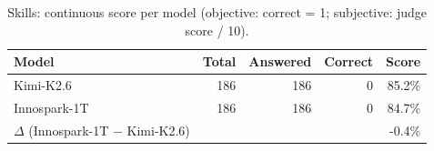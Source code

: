 \begin{table}[H]
  \centering
  \begin{tabular}{l r r r r}
    \toprule
    \textbf{Model} & \textbf{Total} & \textbf{Answered} & \textbf{Correct} & \textbf{Score} \\
    \midrule
    Kimi-K2.6 & 186 & 186 & 0 & 85.2\% \\
    Innospark-1T & 186 & 186 & 0 & 84.7\% \\
    \midrule
    $\Delta$ (Innospark-1T $-$ Kimi-K2.6) & & & & -0.4\% \\
    \bottomrule
  \end{tabular}
  \caption{Skills: continuous score per model (objective: correct = 1; subjective: judge score / 10).}
  \label{tab:cat_skills}
\end{table}